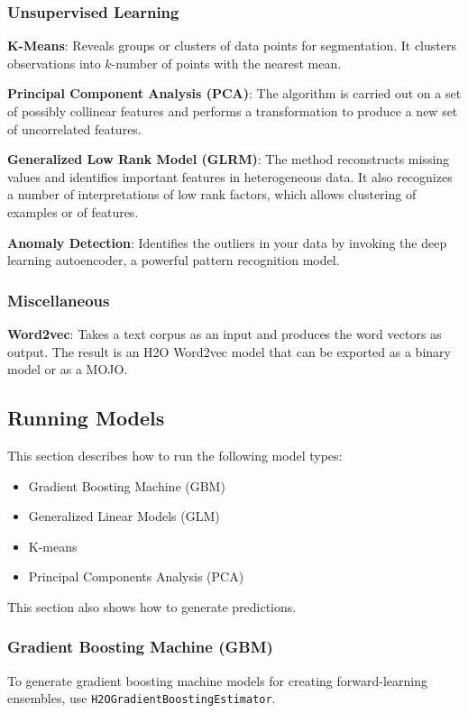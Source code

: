 {\subsubsection{Unsupervised Learning}
{\textbf{K-Means}}: Reveals groups or clusters of data points for segmentation. It clusters observations into $k$-number of points with the nearest mean.

{\textbf{Principal Component Analysis (PCA)}}: The algorithm is carried out on a set of possibly collinear features and performs a transformation to produce a new set of uncorrelated features.

{\textbf{Generalized Low Rank Model (GLRM)}}: The method reconstructs missing values and identifies important features in heterogeneous data. It also recognizes a number of  interpretations of low rank factors, which allows clustering of examples or of features.

{\textbf{Anomaly Detection}}: Identifies the outliers in your data by invoking the deep learning autoencoder, a powerful pattern recognition model.

\subsubsection{Miscellaneous}
{\textbf{Word2vec}}: Takes a text corpus as an input and produces the word vectors as output. The result is an H2O Word2vec model that can be exported as a binary model or as a MOJO.

\subsection{Running Models}
This section describes how to run the following model types:

\begin{itemize}
\item Gradient Boosting Machine (GBM)
\item Generalized Linear Models (GLM)
\item K-means
\item Principal Components Analysis (PCA)

\end{itemize}
This section also shows how to generate predictions.

\newpage
\subsubsection{Gradient Boosting Machine (GBM)}
To generate gradient boosting machine models for creating forward-learning ensembles,
use {\texttt{H2OGradientBoostingEstimator}}.  

}
